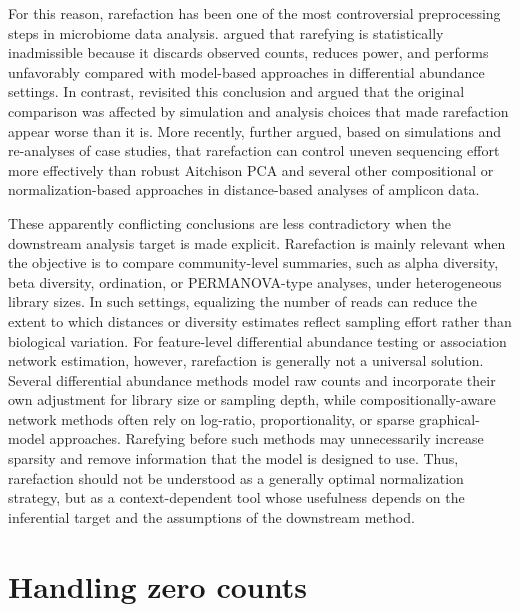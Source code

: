 For this reason, rarefaction has been one of the most controversial preprocessing steps in microbiome data analysis. \citet{mcmurdie2014waste} argued that rarefying is statistically inadmissible because it discards observed counts, reduces power, and performs unfavorably compared with model-based approaches in differential abundance settings. In contrast, \citet{schloss2023waste} revisited this conclusion and argued that the original comparison was affected by simulation and analysis choices that made rarefaction appear worse than it is. More recently, \citet{schloss2026rarefaction} further argued, based on simulations and re-analyses of case studies, that rarefaction can control uneven sequencing effort more effectively than robust Aitchison PCA and several other compositional or normalization-based approaches in distance-based analyses of amplicon data.

These apparently conflicting conclusions are less contradictory when the downstream analysis target is made explicit. Rarefaction is mainly relevant when the objective is to compare community-level summaries, such as alpha diversity, beta diversity, ordination, or PERMANOVA-type analyses, under heterogeneous library sizes. In such settings, equalizing the number of reads can reduce the extent to which distances or diversity estimates reflect sampling effort rather than biological variation. For feature-level differential abundance testing or association network estimation, however, rarefaction is generally not a universal solution. Several differential abundance methods model raw counts and incorporate their own adjustment for library size or sampling depth, while compositionally-aware network methods often rely on log-ratio, proportionality, or sparse graphical-model approaches. Rarefying before such methods may unnecessarily increase sparsity and remove information that the model is designed to use. Thus, rarefaction should not be understood as a generally optimal normalization strategy, but as a context-dependent tool whose usefulness depends on the inferential target and the assumptions of the downstream method.

\section{Handling zero counts}
\label{sec:2micro:zeros}

